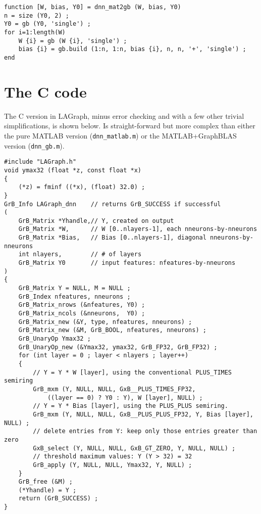 \documentclass[12pt]{article}
\begin{document}
{\footnotesize
\begin{verbatim}
function [W, bias, Y0] = dnn_mat2gb (W, bias, Y0)
n = size (Y0, 2) ;
Y0 = gb (Y0, 'single') ;
for i=1:length(W)
    W {i} = gb (W {i}, 'single') ;
    bias {i} = gb.build (1:n, 1:n, bias {i}, n, n, '+', 'single') ;
end
\end{verbatim}}


\newpage

\section{The C code}

The C version in LAGraph, minus error checking and with a
few other trivial simplifications, is shown below.  Is straight-forward
but more complex than either the pure MATLAB version (\verb'dnn_matlab.m')
or the MATLAB+GraphBLAS version (\verb'dnn_gb.m').

{\footnotesize
\begin{verbatim}
#include "LAGraph.h"
void ymax32 (float *z, const float *x)
{
    (*z) = fminf ((*x), (float) 32.0) ;
}
GrB_Info LAGraph_dnn    // returns GrB_SUCCESS if successful
(
    GrB_Matrix *Yhandle,// Y, created on output
    GrB_Matrix *W,      // W [0..nlayers-1], each nneurons-by-nneurons
    GrB_Matrix *Bias,   // Bias [0..nlayers-1], diagonal nneurons-by-nneurons
    int nlayers,        // # of layers
    GrB_Matrix Y0       // input features: nfeatures-by-nneurons
)
{
    GrB_Matrix Y = NULL, M = NULL ;
    GrB_Index nfeatures, nneurons ;
    GrB_Matrix_nrows (&nfeatures, Y0) ;
    GrB_Matrix_ncols (&nneurons,  Y0) ;
    GrB_Matrix_new (&Y, type, nfeatures, nneurons) ;
    GrB_Matrix_new (&M, GrB_BOOL, nfeatures, nneurons) ;
    GrB_UnaryOp Ymax32 ;
    GrB_UnaryOp_new (&Ymax32, ymax32, GrB_FP32, GrB_FP32) ;
    for (int layer = 0 ; layer < nlayers ; layer++)
    {
        // Y = Y * W [layer], using the conventional PLUS_TIMES semiring
        GrB_mxm (Y, NULL, NULL, GxB__PLUS_TIMES_FP32,
            ((layer == 0) ? Y0 : Y), W [layer], NULL) ;
        // Y = Y * Bias [layer], using the PLUS_PLUS semiring.
        GrB_mxm (Y, NULL, NULL, GxB__PLUS_PLUS_FP32, Y, Bias [layer], NULL) ;
        // delete entries from Y: keep only those entries greater than zero
        GxB_select (Y, NULL, NULL, GxB_GT_ZERO, Y, NULL, NULL) ;
        // threshold maximum values: Y (Y > 32) = 32
        GrB_apply (Y, NULL, NULL, Ymax32, Y, NULL) ;
    }
    GrB_free (&M) ;
    (*Yhandle) = Y ;
    return (GrB_SUCCESS) ;
} \end{verbatim}}
\end{document}
